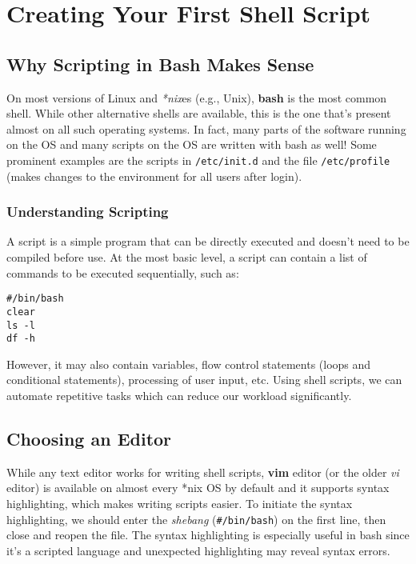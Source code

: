 \chapter{Creating Your First Shell Script}

\section{Why Scripting in Bash Makes Sense}
On most versions of Linux and \textit{*nix}es (e.g., Unix), \textbf{bash} is the most common shell. While other alternative shells are available, this is the one that's present almost on all such operating systems. In fact, many parts of the software running on the OS and many scripts on the OS are written with bash as well! Some prominent examples are the scripts in \verb|/etc/init.d| and the file \verb|/etc/profile| (makes changes to the environment for all users after login).

\subsection{Understanding Scripting}
A script is a simple program that can be directly executed and doesn't need to be compiled before use. At the most basic level, a script can contain a list of commands to be executed sequentially, such as:

\vspace{-15pt}
\begin{verbatim}
#/bin/bash
clear
ls -l
df -h
\end{verbatim}
\vspace{-10pt}	

\noindent
However, it may also contain variables, flow control statements (loops and conditional statements), processing of user input, etc.	Using shell scripts, we can automate repetitive tasks which can reduce our workload significantly. 

\section{Choosing an Editor}
While any text editor works for writing shell scripts, \textbf{vim} editor (or the older \textit{vi} editor) is available on almost every *nix OS by default and it supports syntax highlighting, which makes writing scripts easier. To initiate the syntax highlighting, we should enter the \textit{shebang} (\verb|#/bin/bash|) on the first line, then close and reopen the file. The syntax highlighting is especially useful in bash since it's a scripted language and unexpected highlighting may reveal syntax errors. 


